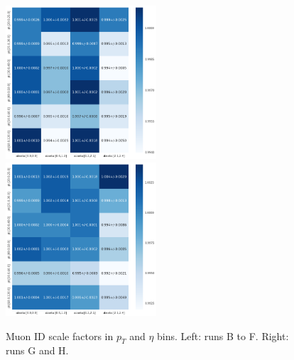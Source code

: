 \begin{figure}
\centering
\includegraphics[width=0.5\textwidth]{figures/muon_ID_BCDEFv2.png}
\bigbreak
\includegraphics[width=0.5\textwidth]{figures/muon_ID_GHv2.png}
\caption{ Muon ID scale factors in $p_{T}$ and $\eta$ bins. Left: runs B to F. Right: runs G and H.}
\label{fig:muonID_SF}
\end{figure}

\newline
\newline


